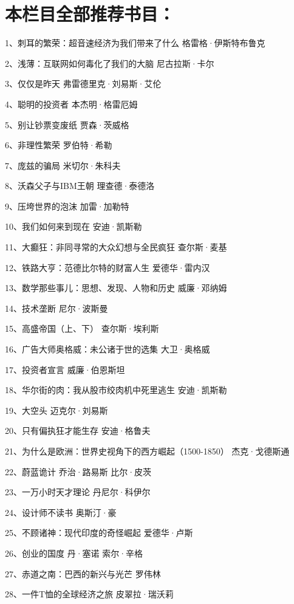 \hypertarget{ux672cux680fux76eeux5168ux90e8ux63a8ux8350ux4e66ux76ee}{%
\section{本栏目全部推荐书目：}\label{ux672cux680fux76eeux5168ux90e8ux63a8ux8350ux4e66ux76ee}}

1、刺耳的繁荣：超音速经济为我们带来了什么 格雷格·伊斯特布鲁克

2、浅薄：互联网如何毒化了我们的大脑 尼古拉斯·卡尔

3、仅仅是昨天 弗雷德里克·刘易斯·艾伦

4、聪明的投资者 本杰明·格雷厄姆

5、别让钞票变废纸 贾森·茨威格

6、非理性繁荣 罗伯特·希勒

7、庞兹的骗局 米切尔·朱科夫

8、沃森父子与IBM王朝 理查德·泰德洛

9、压垮世界的泡沫 加雷·加勒特

10、我们如何来到现在 安迪·凯斯勒

11、大癫狂：非同寻常的大众幻想与全民疯狂 查尔斯·麦基

12、铁路大亨：范德比尔特的财富人生 爱德华·雷内汉

13、数学那些事儿：思想、发现、人物和历史 威廉·邓纳姆

14、技术垄断 尼尔·波斯曼

15、高盛帝国（上、下） 查尔斯·埃利斯

16、广告大师奥格威：未公诸于世的选集 大卫·奥格威

17、投资者宣言 威廉·伯恩斯坦

18、华尔街的肉：我从股市绞肉机中死里逃生 安迪·凯斯勒

19、大空头 迈克尔·刘易斯

20、只有偏执狂才能生存 安迪·格鲁夫

21、为什么是欧洲：世界史视角下的西方崛起（1500-1850） 杰克·戈德斯通

22、蔚蓝诡计 乔治·路易斯 比尔·皮茨

23、一万小时天才理论 丹尼尔·科伊尔

24、设计师不读书 奥斯汀·豪

25、不顾诸神：现代印度的奇怪崛起 爱德华·卢斯

26、创业的国度 丹·塞诺 索尔·辛格

27、赤道之南：巴西的新兴与光芒 罗伟林

28、一件T恤的全球经济之旅 皮翠拉·瑞沃莉

